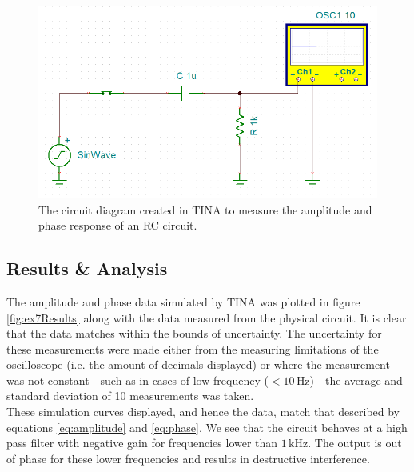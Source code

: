\documentclass[%
reprint,
amsmath,amssymb,
aps,
floatfix
]{revtex4-2}
\begin{document}
		\begin{figure}
			\includegraphics[width=0.85\columnwidth]{circuit_ex7.png}
			\caption{\label{fig:ex7Circuit}The circuit diagram created in TINA to measure the amplitude and phase response of an RC circuit.}
		\end{figure}
		\subsection{Results \& Analysis}
		The amplitude and phase data simulated by TINA was plotted in figure \ref{fig:ex7Results} along with the data measured from the physical circuit. It is clear that the data matches within the bounds of uncertainty. The uncertainty for these measurements were made either from the measuring limitations of the oscilloscope (i.e. the amount of decimals displayed) or where the measurement was not constant - such as in cases of low frequency ($<10 \,\text{Hz}$) - the average and standard deviation of 10 measurements was taken.\\
		
		These simulation curves displayed, and hence the data, match that described by equations \ref{eq:amplitude} and \ref{eq:phase}. We see that the circuit behaves at a high pass filter with negative gain for frequencies lower than $1 \,\text{kHz}$. The output is out of phase for these lower frequencies and results in destructive interference.
		
\end{document}
